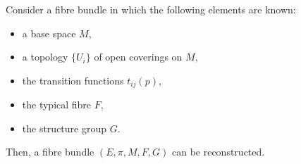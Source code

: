 \begin{theo}

    Consider a fibre bundle in which the following elements are known:
    \begin{itemize}
        \item a base space $M$, 
        \item a topology $\{U_i\}$ of open coverings on $M$, 
        \item the transition functions $t_{ij}(p)$,
        \item the typical fibre $F$, 
        \item the structure group $G$.
    \end{itemize}
    Then, a fibre bundle $(E, \pi, M, F, G)$ can be reconstructed.
    
\end{theo}

